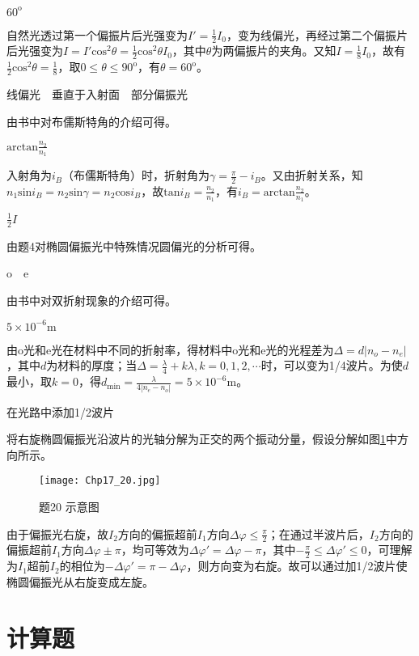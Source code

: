 \exercise $60^{\mathrm{o}}$

\solve 自然光透过第一个偏振片后光强变为$I'=\frac{1}{2}I_0$，变为线偏光，再经过第二个偏振片后光强变为$I=I'\mathrm{cos}^2\theta=\frac{1}{2}\mathrm{cos}^2\theta I_0$，其中$\theta$为两偏振片的夹角。又知$I=\frac{1}{8}I_0$，故有$\frac{1}{2}\mathrm{cos}^2\theta=\frac{1}{8}$，取$0\leqslant\theta\leqslant 90^{\mathrm{o}}$，有$\theta=60^{\mathrm{o}}$。

\exercise 线偏光$\quad$垂直于入射面$\quad$部分偏振光

\solve 由书中对布儒斯特角的介绍可得。

\exercise $\mathrm{arctan}\frac{n_2}{n_1}$

\solve 入射角为$i_B$（布儒斯特角）时，折射角为$\gamma=\frac{\pi}{2}-i_B$。又由折射关系，知$n_1\mathrm{sin}i_B=n_2\mathrm{sin}\gamma=n_2\mathrm{cos}i_B$，故$\mathrm{tan}i_B=\frac{n_2}{n_1}$，有$i_B=\mathrm{arctan}\frac{n_2}{n_1}$。

\exercise $\frac{1}{2}I$

\solve 由题4对椭圆偏振光中特殊情况圆偏光的分析可得。

\exercise o$\quad$e

由书中对双折射现象的介绍可得。

\exercise $5\times 10^{-6}\mathrm{m}$

\solve 由o光和e光在材料中不同的折射率，得材料中o光和e光的光程差为$\Delta=d|n_o-n_e|$，其中$d$为材料的厚度；当$\Delta=\frac{\lambda}{4}+k\lambda,k=0,1,2,\cdots$时，可以变为1/4波片。为使$d$最小，取$k=0$，得$d_{\mathrm{min}}=\frac{\lambda}{4|n_e-n_o|}=5\times 10^{-6}\mathrm{m}$。

\exercise 在光路中添加1/2波片

\solve 将右旋椭圆偏振光沿波片的光轴分解为正交的两个振动分量，假设分解如图\ref{fig:17_20}中方向所示。

\begin{figure}[htbp]
	\centering
	\texttt{[image: Chp17\_20.jpg]}
	\caption{题20 示意图}
	\label{fig:17_20}
\end{figure}

由于偏振光右旋，故$I_2$方向的偏振超前$I_1$方向$\Delta \varphi\leqslant\frac{\pi}{2}$；在通过半波片后，$I_2$方向的偏振超前$I_1$方向$\Delta \varphi\pm\pi$，均可等效为$\Delta \varphi'=\Delta \varphi-\pi$，其中$-\frac{\pi}{2}\leqslant\Delta \varphi'\leqslant0$，可理解为$I_1$超前$I_2$的相位为$-\Delta \varphi'=\pi-\Delta \varphi$，则方向变为右旋。故可以通过加1/2波片使椭圆偏振光从右旋变成左旋。

\section{计算题}
\exercise 

